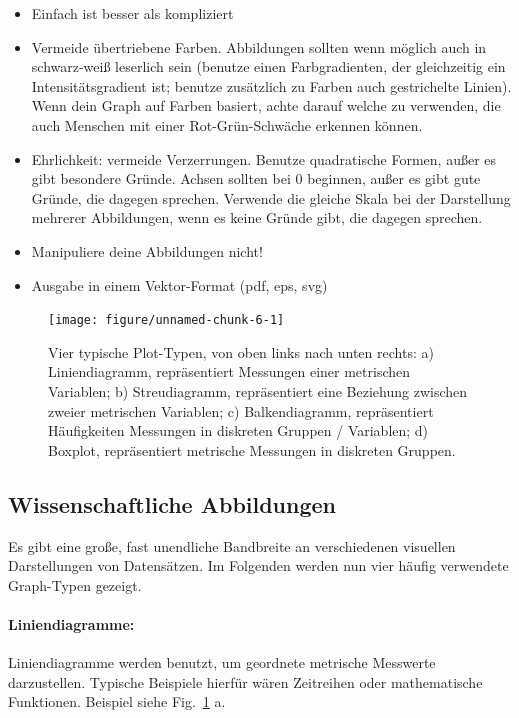 \documentclass[a4paper,twoside]{tufte-book}\usepackage[]{graphicx}\usepackage[]{color}
\begin{document}
\begin{itemize}
\item Einfach ist besser als kompliziert
\item Vermeide übertriebene Farben. Abbildungen sollten wenn möglich auch in schwarz-weiß leserlich sein (benutze einen Farbgradienten, der gleichzeitig ein Intensitätsgradient ist; benutze zusätzlich zu Farben auch gestrichelte Linien). Wenn dein Graph auf Farben basiert, achte darauf welche zu verwenden, die auch Menschen mit einer Rot-Grün-Schwäche erkennen können.
\item Ehrlichkeit: vermeide Verzerrungen. Benutze quadratische Formen, außer es gibt besondere Gründe. Achsen sollten bei 0 beginnen, außer es gibt gute Gründe, die dagegen sprechen. Verwende die gleiche Skala bei der Darstellung mehrerer Abbildungen, wenn es keine Gründe gibt, die dagegen sprechen. 
\item Manipuliere deine Abbildungen nicht!
\item Ausgabe in einem Vektor-Format (pdf, eps, svg)
\end{itemize}

\begin{figure}[htbp]
\begin{center}

\begin{Schunk}

\texttt{[image: figure/unnamed-chunk-6-1]} \end{Schunk}
\caption{Vier typische Plot-Typen, von oben links nach unten rechts: a) Liniendiagramm, repräsentiert Messungen einer metrischen Variablen; b) Streudiagramm, repräsentiert eine Beziehung zwischen zweier metrischen Variablen; c) Balkendiagramm, repräsentiert Häufigkeiten Messungen in diskreten Gruppen / Variablen; d) Boxplot, repräsentiert metrische Messungen in diskreten Gruppen.}
\label{fig: exaple plots}
\end{center}
\end{figure}


\subsection{Wissenschaftliche Abbildungen}

Es gibt eine große, fast unendliche Bandbreite an verschiedenen visuellen Darstellungen von Datensätzen. Im Folgenden werden nun vier häufig verwendete Graph-Typen gezeigt. 

\paragraph{Liniendiagramme:} Liniendiagramme werden benutzt, um geordnete metrische Messwerte darzustellen. Typische Beispiele hierfür wären Zeitreihen oder mathematische Funktionen. Beispiel siehe Fig.~\ref{fig: exaple plots} a.
\end{document}
